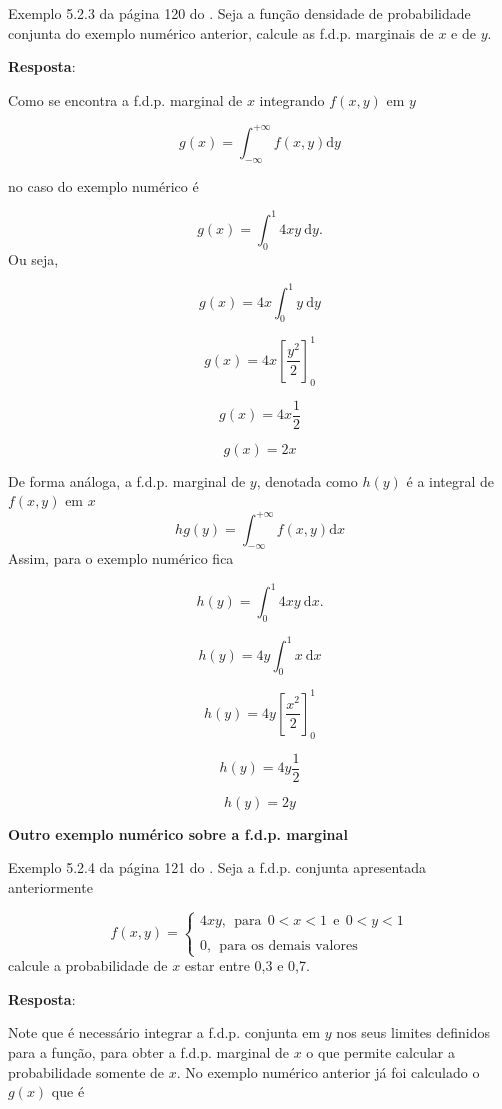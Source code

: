 \documentclass[
]{book}
\begin{document}
Exemplo 5.2.3 da página 120 do \citet{Sartoris2013}. Seja a função densidade de probabilidade conjunta do exemplo numérico anterior, calcule as f.d.p. marginais de \(x\) e de \(y\).

\textbf{Resposta}:

Como se encontra a f.d.p. marginal de \(x\) integrando \(f(x,y)\) em \(y\)

\[
  g(x) = \int_{-\infty}^{+\infty} f(x,y) \text{d}y
\]

no caso do exemplo numérico é

\[
  g(x) = \int_{0}^{1} 4xy~ \text{d}y.
\]
Ou seja,

\[
  g(x) = 4x\int_{0}^{1} y~ \text{d}y
\]

\[
  g(x) = 4x\left[ \dfrac{y^2}{2} \right]_{0}^{1}
\]

\[
  g(x) = 4x\dfrac{1}{2}
\]

\[
  g(x) = 2x
\]

De forma análoga, a f.d.p. marginal de \(y\), denotada como \(h(y)\) é a integral de \(f(x,y)\) em \(x\)
\[
hg(y) = \int_{-\infty}^{+\infty} f(x,y) \text{d}x
\]
Assim, para o exemplo numérico fica

\[
  h(y) = \int_{0}^{1} 4xy~ \text{d}x.
\]

\[
  h(y) = 4y\int_{0}^{1} x~ \text{d}x
\]

\[
  h(y) = 4y\left[ \dfrac{x^2}{2} \right]_{0}^{1}
\]

\[
  h(y) = 4y\dfrac{1}{2}
\]

\[
  h(y) = 2y
\]

\textbf{Outro exemplo numérico sobre a f.d.p. marginal}

Exemplo 5.2.4 da página 121 do \citet{Sartoris2013}. Seja a f.d.p. conjunta apresentada anteriormente

\begin{equation}
  f(x,y) = 
    \begin{cases}
      4xy,~~\text{para}~~0 < x < 1~~\text{e}~~0 < y < 1 \\
      \\
      0, ~~\text{para os demais valores}
    \end{cases}
\end{equation}
calcule a probabilidade de \(x\) estar entre 0,3 e 0,7.

\textbf{Resposta}:

Note que é necessário integrar a f.d.p. conjunta em \(y\) nos seus limites definidos para a função, para obter a f.d.p. marginal de \(x\) o que permite calcular a probabilidade somente de \(x\). No exemplo numérico anterior já foi calculado o \(g(x)\) que é
\end{document}
